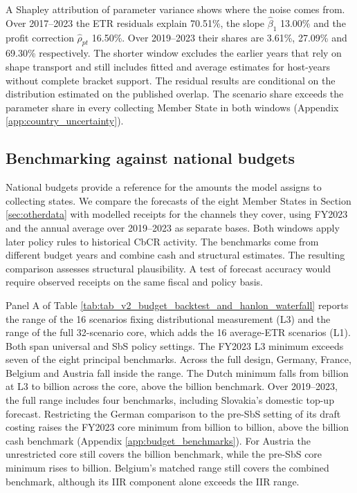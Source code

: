 \documentclass[11pt,a4paper]{article}
\newcommand{\EUR}{\texteuro}
\begin{document}
A Shapley attribution of parameter variance shows where the noise comes from. Over 2017–2023 the ETR residuals explain 70.51\%, the slope $\hat\beta_1$ 13.00\% and the profit correction $\hat\rho_{pt}$ 16.50\%. Over 2019–2023 their shares are 3.61\%, 27.09\% and 69.30\% respectively. The shorter window excludes the earlier years that rely on shape transport and still includes fitted and average estimates for host-years without complete bracket support. The residual results are conditional on the distribution estimated on the published overlap. The scenario share exceeds the parameter share in every collecting Member State in both windows (Appendix \ref{app:country_uncertainty}).

\subsection{Benchmarking against national budgets}\label{sec:backtest}

National budgets provide a reference for the amounts the model assigns to collecting states. We compare the forecasts of the eight Member States in Section \ref{sec:otherdata} with modelled receipts for the channels they cover, using FY2023 and the annual average over 2019–2023 as separate bases. Both windows apply later policy rules to historical CbCR activity. The benchmarks come from different budget years and combine cash and structural estimates. The resulting comparison assesses structural plausibility. A test of forecast accuracy would require observed receipts on the same fiscal and policy basis.



Panel A of Table \ref{tab:tab_v2_budget_backtest_and_hanlon_waterfall} reports the range of the 16 scenarios fixing distributional measurement (L3) and the range of the full 32-scenario core, which adds the 16 average-ETR scenarios (L1). Both span universal and SbS policy settings. The FY2023 L3 minimum exceeds seven of the eight principal benchmarks. Across the full design, Germany, France, Belgium and Austria fall inside the range. The Dutch minimum falls from \EUR6.705 billion at L3 to \EUR0.254 billion across the core, above the \EUR0.176 billion benchmark. Over 2019–2023, the full range includes four benchmarks, including Slovakia's domestic top-up forecast. Restricting the German comparison to the pre-SbS setting of its draft costing raises the FY2023 core minimum from \EUR0.744 billion to \EUR1.666 billion, above the \EUR1.000 billion cash benchmark (Appendix \ref{app:budget_benchmarks}). For Austria the unrestricted core still covers the \EUR0.100 billion benchmark, while the pre-SbS core minimum rises to \EUR0.149 billion. Belgium's matched range still covers the combined benchmark, although its IIR component alone exceeds the IIR range.
\end{document}
